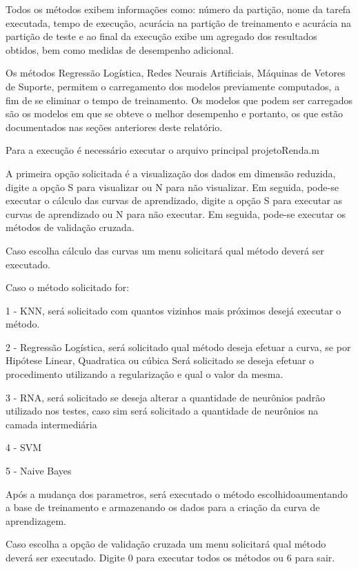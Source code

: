 
Todos os métodos exibem informações como: número da partição, nome da tarefa executada, tempo de execução, acurácia na partição de treinamento e acurácia na partição de teste e ao final da execução exibe um agregado dos resultados obtidos, bem como medidas de desempenho adicional.

Os métodos Regressão Logística, Redes Neurais Artificiais, Máquinas de Vetores de Suporte, permitem o carregamento dos modelos previamente computados, a fim de se eliminar o tempo de treinamento. Os modelos que podem ser carregados são os modelos em que se obteve o melhor desempenho e portanto, os que estão documentados nas seções anteriores deste relatório.

Para a execução é necessário executar o arquivo principal projetoRenda.m

A primeira opção solicitada é a visualização dos dados em dimensão reduzida, digite a opção S para visualizar ou N para não visualizar. Em seguida, pode-se executar o cálculo das curvas de aprendizado, digite a opção S para executar as curvas de aprendizado ou N para não executar. Em seguida, pode-se executar os métodos de validação cruzada.

Caso escolha cálculo das curvas um menu solicitará qual método deverá ser executado.

Caso o método solicitado for:

1 - KNN, será solicitado com quantos vizinhos mais próximos desejá executar o método.

2 - Regressão Logística, será solicitado qual método deseja efetuar a curva, se por Hipótese Linear, Quadratica ou cúbica
Será solicitado se deseja efetuar o procedimento utilizando a regularização e qual o valor da mesma.

3 - RNA, será solicitado se deseja alterar a quantidade de neurônios padrão utilizado nos testes, caso sim será solicitado a quantidade de neurônios na camada intermediária

4 - SVM

5 - Naive Bayes

Após a mudança dos parametros, será executado o método escolhidoaumentando a base de treinamento e armazenando os dados para a criação da curva de aprendizagem.

Caso escolha a opção de validação cruzada um menu solicitará qual método deverá ser executado. Digite 0 para executar todos os métodos ou 6 para sair.


